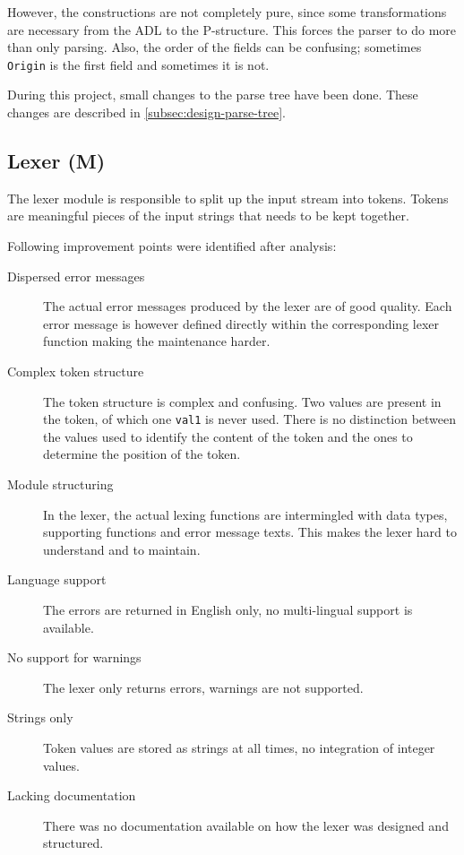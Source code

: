 However, the constructions are not completely pure, since some transformations are necessary from the ADL to the P-structure.
This forces the parser to do more than only parsing.
Also, the order of the fields can be confusing; sometimes \texttt{Origin} is the first field and sometimes it is not.

During this project, small changes to the parse tree have been done.
These changes are described in \autoref{subsec:design-parse-tree}.

\subsection{Lexer (M)}
\label{subsec:analysis-lexer}
The lexer module is responsible to split up the input stream into tokens.
Tokens are meaningful pieces of the input strings that needs to be kept together.

Following improvement points were identified after analysis:

\begin{description}
  \item[Dispersed error messages]
    The actual error messages produced by the lexer are of good quality.
     Each error message is however defined directly within the corresponding lexer function making the maintenance harder.
  \item[Complex token structure]
    The token structure is complex and confusing.
    Two values are present in the token, of which one \texttt{val1} is never used.
    There is no distinction between the values used to identify the content of the token and the ones to determine the position of the token.
  \item[Module structuring]
    In the lexer, the actual lexing functions are intermingled with data types, supporting functions and error message texts.
    This makes the lexer hard to understand and to maintain.
  \item[Language support]
    The errors are returned in English only, no multi-lingual  support is available.
  \item[No support for warnings]
    The lexer only returns errors, warnings are not supported. 
  \item[Strings only]
    Token values are stored as strings at all times, no integration of integer values.
  \item[Lacking documentation]
    There was no documentation available on how the lexer was designed and structured.
\end{description}


